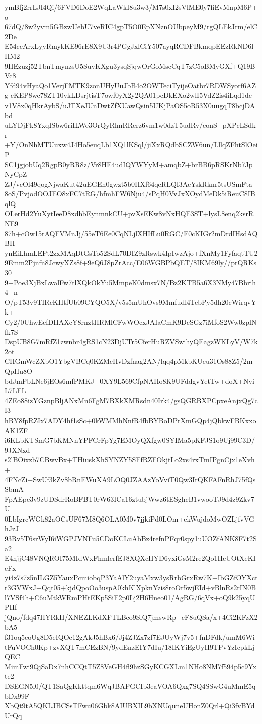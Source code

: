 ymBfj2rrLJI4Qi/6FVD6DoE2WqLaWkI8u3w3/M7s0xI2sVlME0y7fiEvMnpM6P+o
67dQ/8w2yvm5GBzwUebU7veRIC4gpT5O0EpXNznOUbpeyM9/rgQLEkJrm/elC2De
E54ccArxLyyRmykKE96rE8X9U3r4PGgJxlCiY507ayqRCDFBkmqpEEzRkND6lHM2
9HEzuzj52TbnTmynzsU5SuvKXgu3ysqSjqwOrGoMscCqT7zC5oBMyGXf+Q19BVc8
Yfd94vHyaQo1VerjFMTK9zonUHyUuJbB4o2OWTeciTyijeOatbr7RDWSyorf6AZg
cKEP8wc78ZT10vkLDsrjtisT7owf0yX2y2QA01pcDkEXo2wlI5VdZ2is4iLqd1dc
v1V8x0qHkrAybS/uJTXeJUnDwtZfXUawQsin5UKjPaOS5oR53X0uugqT8bcjDAbd
uLYDjFk8YxqISbw6riILWe3OrQyRlmRRerz6vm1w0dzT5udRv/eonS+pXPcLSdkr
+Y/OnNhMTUuxw4J4Ho5euqLb1XQ1lKSql/jiXxRQdbSCZW6un/LllqZFhtSlOeiP
SC1jgjobUq2RgpB0yRR8z/Vr8HE4udIQYWYyM+amqbZ+brBB6pRSKrNb7JpNyCpZ
ZJ/vcOl49qogNjwaKut42uEGEn0gwzt5b0HXf64qeRLQI3AcYskRknr5tsUSmFta
8oS/PvjodOOJEO8xFC7tRG/hfmhFW6Nju4/sPqH0VvJxXOydMeDk5iReuC8IBqlQ
OLerHd2YuXytIeeD8xdhbEynmnkCU+pvXsEKw8vNxHQE3ST+lysL8enq2ksrRNE9
87h+cOw15rAQFVMnJj/55eT6Ee0CqNLjlXHIfLu0RGC/F0cKIGr2mDrdIHsdAQBH
ynEiLhmLEPt2zxMAqDtGsTo52SdL70DIZ9zRswk4IpIwzAjo+fXnMy1FyfaqtTU2
9Emm2Pjnfn8JcwyXZs8f+9eQ6J8pZrAcc/E06WGBPbQET/8IKM69ly//prQRKs30
9+Poe3XjBxLwalFw7tlXQkOkYu5MmpeK0dmsx7N/Bz2KTB5a6X3NMy47Bbrih4+n
O/pT53v9TIRcKHtfUb09CYQO5X/v5s5mUhOvs9Mmfudl4TcbPy5dh20cWirqvYk+
Cy2/0UhwEcfDHAXcY8rnztHRMlCFwWOcxJAIaCmK9DcSGz7iMfoS2Ww0zplNfk7S
DspUB8G7mRfZ1zwnbr4gRS1cN23DjUTr5CferHuRZVSwihyQEagzWKLyV/W7k2ot
CHGmWcZXbO1YbgVBCq0KZMcHvDzfnag2AN/lqq4pMkbKUeu31Os88Z5/2mQpHu8O
bdJmPbLNe6jEOs6mfPMKJ+0XY9L569CfpNAHo8K9UFddgvYetTw+doX+NviL7LFL
4ZEo88izYGznpBljANxMn6FgM7BXkXMRsdn40Irk4/gsQGRBXPCpxeAnjxQg7cI3
hBY8fpRZIx7ADY4hf1sSc+0kWMMhNnfR4fbBYBoDPrXmGQp4jQbkwFBKxxoAK1ZF
i6KLbKTSmG7bKMNnYPFCrFpYg7EMOyQXfgw0SYIMa5pKFJS1o9Uj99C3D/9JXNxd
s2lBOixzb7CBwvBx+THiuskXhSYNZY5SFfRZFOkjtLo2xs4rxTmIPgnCjx1eXvh+
4FNcZi+SwUf3kZv8bRnEWuXA9LOQ0JZAAzYoVviT0Qw3IrQKFAFnRhJ75fQsSbmA
FpAEpe3v9zUDSdrRoBFBT0rW63ICa16ztubjWwz6tESghcB1vwooTJ9d4z9Zkv7U
0LbIgrcWGk82aOCsUF67M8Q6OLA0M0v7jjkiPd0LOm+ekWujdoMwOZLjfvVGhJzJ
93Rv5T6srWyI6iWGPJVNFu5CDoKCLuAbBz4refnPFqr0spy1uUOZfANK8F7t2Sa2
E4hjjC48VNQROI75MIdWxFhmlerfEJ8XQXcHYD6yxiGsM2re2Qo1HcUOtXeKIeFx
yi4z7s7z5nILGZ5YauxPcmiobqP3YaAlY2uyaMxw3ysRrbGrxRw7K+IbGZfOYXct
r3GVWxJ+Qqt05+kjdQpoOo3uspA0khKlXpknYzis8roOr5wjEId+vBlnRs2rIN0B
l7VSf4h+C6uMtkWRmPHtEKp5SiF2p0Lj2H6Hneo01/AgRG/6qVx+oQ9k25yqUPHf
jQno/fdq47HYRkH/XNEZLKdXFTLBco9SlQ7jmswRp+cF8uQSa/x+4Ci2KFzX2bA5
f31oq5coUg8D5eIQOe12gAkJ5hBx6/Jj4ZJZx7zf7EJUyWj7v5+fnDFdk/umM6Wi
tFuVOCh0Kp+zvXQT7mCEzBN/9ydEnzEIY7dIu/18IKYiEgUyH9TPvYzIcpkLjQEC
MimFwi9QjSaDx7nhCCQtT5Z8VeGH4fl9hzSGyKCGXLm1NHo8NM7f594p5c9Yxte2
DSEGN5l0/QT1SaQgKkttqm6WqJBAPGCIb3eaVOA6Qxg7SQ4SSwG4uMmE5qbDx99F
XbQt9tA5QKLJBCSsTFwu06Gbk8AIUBXIL9bXNUquneUHonZ0Qrl+Qi3fvBYdUrQq
